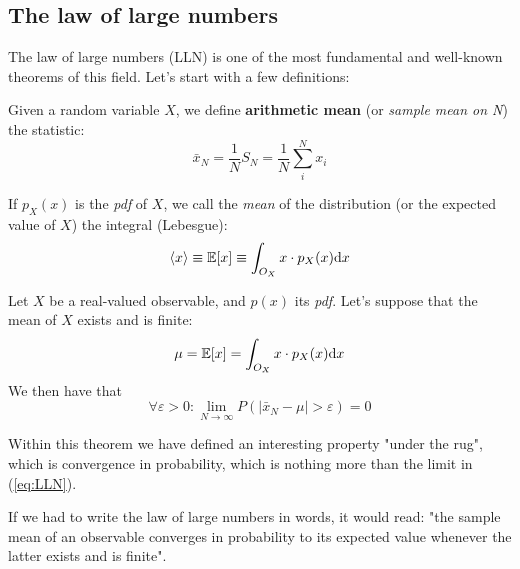 \subsection{The law of large numbers}
\label{subsec:LLN}
The law of large numbers (LLN) is one of the most fundamental and well-known theorems of this field. Let's start with a few definitions:
\begin{definition}
	Given a random variable $X$, we define \textbf{arithmetic mean} (or \emph{sample mean on N}) the statistic:
	\[
	\bar{x}_N = \frac{1}{N}S_N = \frac{1}{N}\sum_i^N x_i
	\]
\end{definition}

\begin{definition}[Mean]
	If $p_X(x)$ is the \emph{pdf} of $X$, we call the \emph{mean} of the distribution (or the expected value of $X$) the integral (Lebesgue):
	\[
	\langle x\rangle\equiv \mathbb{E}[x] \equiv \int_{O_X} x\cdot p_X(x)\mathrm{d} x
	\]
\label{def:mean}
\end{definition}

\begin{theorem}
	Let $X$ be a real-valued observable, and $p(x)$ its \emph{pdf}. Let's suppose that the mean of $X$ exists and is finite:
	\begin{equation}
	\mu = \mathbb{E}[x]=\int_{O_X} x\cdot p_X(x)\mathrm{d} x
	\label{eq:LLN_mean}
	\end{equation}
	We then have that 
	\begin{equation}
	\forall \varepsilon > 0: \lim_{N\to\infty} P\left( \left| \bar{x}_N - \mu\right| > \varepsilon\right) =0
	\label{eq:LLN}
	\end{equation}
\end{theorem}


Within this theorem we have defined an interesting property "under the rug", which is convergence in probability, which is nothing more than the limit in (\ref{eq:LLN}).

If we had to write the law of large numbers in words, it would read: "the sample mean of an observable converges in probability to its expected value whenever the latter exists and is finite". 

